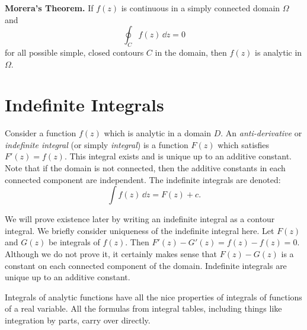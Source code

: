 
\begin{Result}
  \label{moreras_theorem}
  \textbf{Morera's Theorem.}
  If $f(z)$ is continuous in a simply connected domain $\Omega$ and 
  \[
  \oint_C f(z) \,\dd z = 0
  \]
  for all possible simple, closed contours $C$ in the domain, 
  then $f(z)$ is analytic in $\Omega$.
\end{Result}








\section{Indefinite Integrals}





Consider a function $f(z)$ which is analytic in a domain $D$.  An 
\textit{anti-derivative} or \textit{indefinite integral}
(or simply \textit{integral})
is a function $F(z)$ which satisfies $F'(z) = f(z)$.  This integral
exists and is unique up to an additive constant.  Note that if the 
domain is not connected, then the additive constants in each connected 
component are independent.  The indefinite integrals are denoted:
\[
\int f(z) \,\dd z = F(z) + c.
\]


We will prove existence later by writing 
an indefinite integral as a contour integral.  We briefly consider 
uniqueness of the indefinite integral here.
Let $F(z)$ and $G(z)$ be integrals of $f(z)$.  Then
$F'(z) - G'(z) = f(z) - f(z) = 0$.  Although we do not prove it, it 
certainly makes sense that 
$F(z) - G(z)$ is a constant on each connected component of the domain.
Indefinite integrals are unique up to an additive constant.

Integrals of analytic functions have all the nice properties of 
integrals of functions of a real variable.  All the formulas from
integral tables, including things like integration by parts, 
carry over directly.








